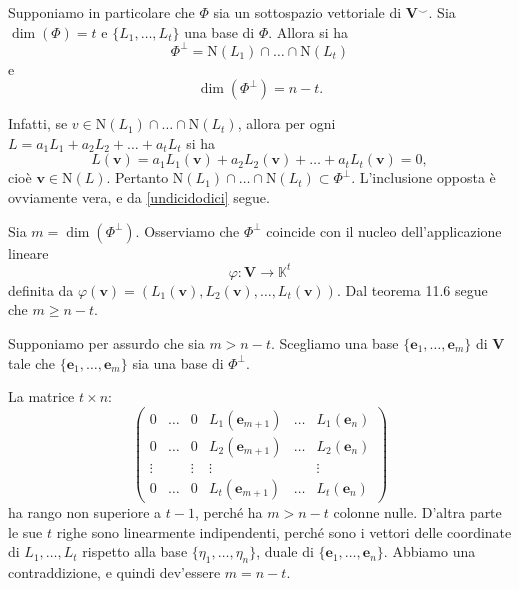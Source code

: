 \documentclass{article}
\theoremstyle{plain}
\theoremstyle{definition}
\theoremstyle{remark}
\begin{document}
Supponiamo in particolare che $\Phi$ sia un sottospazio vettoriale di $\mathbf{V}^{\smallsmile}$. 
Sia $\dim(\Phi) = t$ e $\{L_1, \dots, L_t\}$ una base di $\Phi$. Allora si ha
\begin{equation}\label{undicidodici}
    \Phi^\perp = \mathrm{N}(L_1) \cap \dots \cap \mathrm{N}(L_t)
\end{equation}
e
\begin{equation}\label{undicitredici}
\dim(\Phi^\perp) = n - t.    
\end{equation}

Infatti, se $v \in \mathrm{N}(L_1) \cap \dots \cap \mathrm{N}(L_t)$, allora per ogni $L = a_1L_1 + a_2L_2 + \dots + a_tL_t$ si ha
\[
L(\mathbf{v}) = a_1L_1(\mathbf{v}) + a_2L_2(\mathbf{v}) + \dots + a_tL_t(\mathbf{v}) = 0,
\]
cioè $\mathbf{v} \in \mathrm{N}(L)$. Pertanto $\mathrm{N}(L_1) \cap \dots \cap \mathrm{N}(L_t) \subset \Phi^\perp$. 
L'inclusione opposta è ovviamente vera, e da \ref{undicidodici} segue.

Sia $m = \dim(\Phi^\perp)$. Osserviamo che $\Phi^\perp$ coincide con il nucleo dell'applicazione lineare
\[
\varphi : \mathbf{V} \to \mathbb{K}^t
\]
definita da $\varphi(\mathbf{v}) = (L_1(\mathbf{v}), L_2(\mathbf{v}), \dots, L_t(\mathbf{v}))$. Dal teorema 11.6 segue che $m \geq n - t$.

Supponiamo per assurdo che sia $m > n - t$. 
Scegliamo una base $\{\mathbf{e}_1, \dots, \mathbf{e}_m\}$ di $\mathbf{V}$ tale che $\{\mathbf{e}_1, \dots, \mathbf{e}_m\}$ sia una base di $\Phi^\perp$.

La matrice $t \times n$:
\[ 
\begin{pmatrix}
0 & \dots & 0 & L_1(\mathbf{e}_{m+1}) & \dots & L_1(\mathbf{e}_n) \\
0 & \dots & 0 & L_2(\mathbf{e}_{m+1}) & \dots & L_2(\mathbf{e}_n) \\
\vdots & & \vdots & \vdots & & \vdots \\
0 & \dots & 0 & L_t(\mathbf{e}_{m+1}) & \dots & L_t(\mathbf{e}_n)
\end{pmatrix}
\]
ha rango non superiore a $t - 1$, perché ha $m > n - t$ colonne nulle. 
D'altra parte le sue $t$ righe sono linearmente indipendenti, perché sono i vettori delle coordinate di $L_1, \dots, L_t$ rispetto alla base $\{\eta_1, \dots, \eta_n\}$, duale di $\{\mathbf{e}_1, \dots, \mathbf{e}_n\}$. 
Abbiamo una contraddizione, e quindi dev'essere $m = n - t$.

\vspace{10pt}
\end{document}
